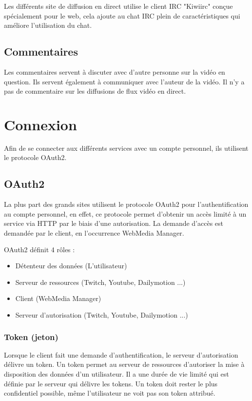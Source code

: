 \documentclass[11pt]{report} %
\begin{document}
		Les différents site de diffusion en direct utilise le client IRC "Kiwiirc" conçue spécialement pour le web, cela ajoute au chat IRC plein de caractéristiques qui améliore l'utilisation du chat.
		
		\subsection{Commentaires}
		Les commentaires servent à discuter avec d'autre personne sur la vidéo en question. Ils servent également à communiquer avec l'auteur de la vidéo.
		Il n'y a pas de commentaire sur les diffusions de flux vidéo en direct.
		
		
	\section{Connexion}
	Afin de se connecter aux différents services avec un compte personnel, ils utilisent le protocole OAuth2.
		\subsection{OAuth2}
		La plus part des grands sites utilisent le protocole OAuth2 pour l'authentification au compte personnel, en effet, ce protocole permet d'obtenir un accès limité à un service via HTTP par le biais d'une autorisation. 
		La demande d'accès est demandée par le client, en l'occurrence WebMedia Manager.
	
		OAuth2 définit 4 rôles :
		\begin{itemize}
			\item Détenteur des données (L'utilisateur)
			\item Serveur de ressources (Twitch, Youtube, Dailymotion ...)
			\item Client (WebMedia Manager)
			\item Serveur d'autorisation (Twitch, Youtube, Dailymotion ...)
		\end{itemize}
		
			\subsubsection{Token (jeton)}
			Lorsque le client fait une demande d'authentification, le serveur d'autorisation délivre un token. Un token permet au serveur de ressources d'autoriser la mise à disposition des données d'un utilisateur. Il a une durée de vie limité qui est définie par le serveur qui délivre les tokens.
			Un token doit rester le plus confidentiel possible, même l'utilisateur ne voit pas son token attribué.
			
\end{document}
